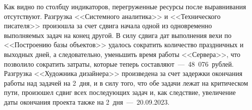 Как видно по столбцу индикаторов, перегруженные ресурсы после выравнивания
отсутствуют. Разгрузка <<Системного аналитика>> и <<Технического писателя>>
произошла за счет сдвига начала одной из одновременно выполняемых задач на
конец другой. В силу сдвига дат выполнения вехи по <<Построению базы объектов>>
удалось сократить количество праздничных и выходных дней, а следовательно,
уменьшить время работы <<Сервера>>, что позволило сократить затраты, которые
теперь составляют~---~48~076~рублей. Разгрузка <<Художника дизайнера>>
произведена за счет задержки окончания работы над задачей на 2~дня, и в силу
того, что обе задачи лежат на критическом пути, произошел сдвиг всех последующих
задач и, как следствие, увеличение даты окончания проекта также на
2~дня~---~20.09.2023.
